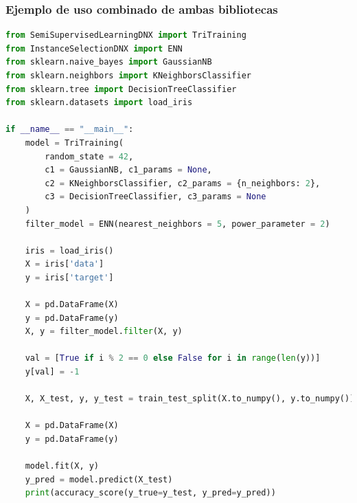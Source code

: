 \subsubsection{Ejemplo de uso combinado de ambas bibliotecas}
\begin{lstlisting}[language=Python, caption={Ejemplo de uso de IS-SSL}, label={lst:ejemplo}]
from SemiSupervisedLearningDNX import TriTraining
from InstanceSelectionDNX import ENN
from sklearn.naive_bayes import GaussianNB
from sklearn.neighbors import KNeighborsClassifier
from sklearn.tree import DecisionTreeClassifier
from sklearn.datasets import load_iris
	
if __name__ == "__main__":
	model = TriTraining(
		random_state = 42,
		c1 = GaussianNB, c1_params = None,
		c2 = KNeighborsClassifier, c2_params = {n_neighbors: 2},
		c3 = DecisionTreeClassifier, c3_params = None	
	)
	filter_model = ENN(nearest_neighbors = 5, power_parameter = 2)
	
	iris = load_iris()
	X = iris['data']
	y = iris['target']

	X = pd.DataFrame(X)
	y = pd.DataFrame(y)
	X, y = filter_model.filter(X, y)

	val = [True if i % 2 == 0 else False for i in range(len(y))]
	y[val] = -1

	X, X_test, y, y_test = train_test_split(X.to_numpy(), y.to_numpy())

	X = pd.DataFrame(X)
	y = pd.DataFrame(y)

	model.fit(X, y)
	y_pred = model.predict(X_test)
	print(accuracy_score(y_true=y_test, y_pred=y_pred))
	
\end{lstlisting}